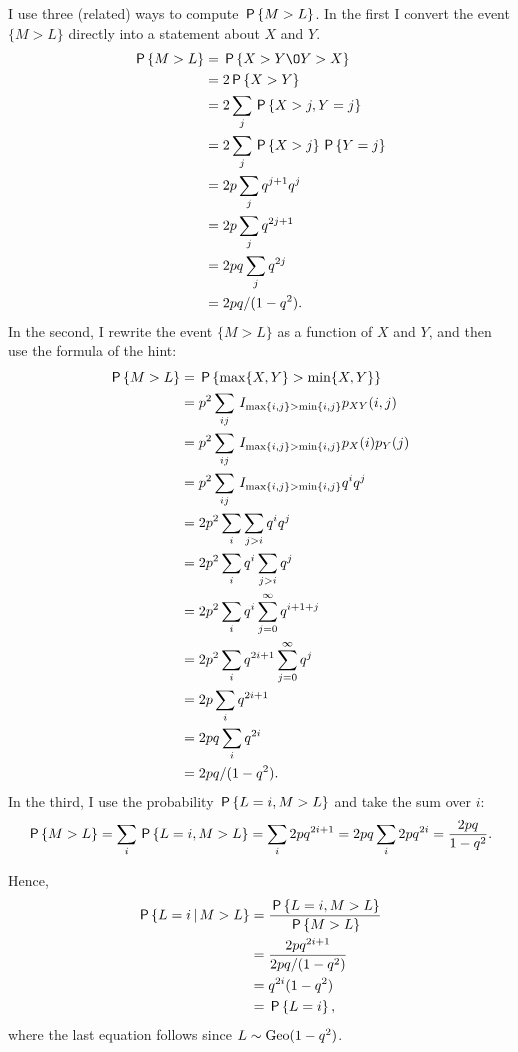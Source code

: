 \documentclass[a4paper,12pt]{article}
\begin{document}
\begin{exercise}
\begin{solution}
I use three (related) ways to compute $\P{M>L}$. In the first I convert the event $\{M>L\}$ directly into a statement about $X$ and $Y$.
\begin{align}
  \label{eq:3}
\P{M>L} 
&= \P{X>Y \O Y > X} \\
&= 2\P{X>Y} \\
&= 2\sum_{j} \P{X>j,Y=j} \\
&= 2\sum_{j}  \P{X>j}\P{Y=j} \\
&= 2p\sum_{j} q^{j+1} q^j\\
&= 2p\sum_{j} q^{2j+1}\\
&= 2pq\sum_{j} q^{2j}\\
&= 2pq/(1-q^2).
\end{align}
In the second,  I rewrite the event $\{M>L\}$ as a function of $X$ and $Y$, and then use  the formula of the hint:
\begin{align}
  \label{eq:4}
\P{M>L}  &= \P{\max{X, Y} > \min{X,Y}} \\
&=p^2\sum_{ij}\1{\max{i, j} > \min{i, j}} p_{XY}(i,j) \\
&=p^2\sum_{ij}\1{\max{i, j} > \min{i, j}} p_{X}(i)p_{Y}(j) \\
&=p^2\sum_{ij}\1{\max{i, j} > \min{i, j}} q^i q^j \\
&=2p^2\sum_{i}\sum_{j>i} q^i q^j \\
&=2p^2\sum_{i}q^i \sum_{j>i} q^j \\
&=2p^2\sum_{i}q^i \sum_{j=0}^\infty q^{i+1+j} \\
&=2p^2\sum_{i}q^{2i+1} \sum_{j=0}^\infty q^{j} \\
&=2p\sum_{i}q^{2i+1} \\
&=2pq\sum_{i}q^{2i} \\
&=2pq/(1-q^2).
\end{align}
In the third, I use the probability $\P{L=i, M>L}$ and take the sum over $i$:
\begin{align}
  \label{eq:48}
\P{M>L} = \sum_{i} \P{L=i, M>L}  = \sum_{i} 2pq^{2i+1} = 2pq\sum_{i} 2pq^{2i} = \frac{2pq}{1-q^{2}}.
\end{align}

Hence, 
\begin{align}
\P{L=i\given M > L} 
&=\frac{\P{L=i, M > L}}{\P{M>L}} \\
&=\frac{2p q^{2i+1}}{2pq/(1-q^2)} \\
&=q^{2i}(1-q^2) \\
&= \P{L=i},
\end{align}
where the last equation follows since $L\sim \Geo{1-q^2}$.

\end{solution}
\end{exercise}
\end{document}
